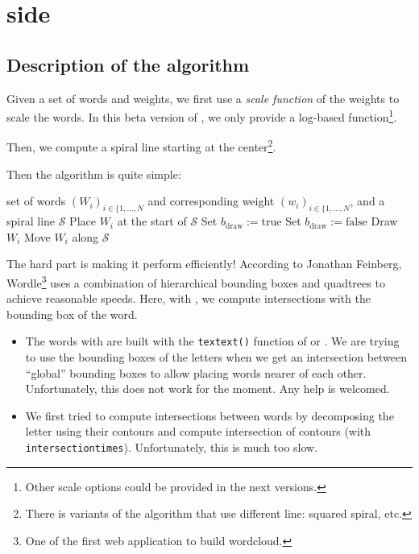\documentclass[english]{ltxdoc}
\begin{document}
\section{ side}

\subsection{Description of the algorithm}

Given a set of words and weights, we first use a
\emph{scale function} of the weights to scale the words. In this beta version of
, we only provide a log-based function\footnote{Other scale
options could be provided in the next versions.}. 

Then, we compute a spiral line starting at the center\footnote{There is variants
of the algorithm that use different line: squared spiral, etc.}.

Then the algorithm is quite simple:
\begin{algorithmic}[1]
\Require set of words $(W_i)_{i\in\{1,\dots,N}$ and corresponding weight
$(w_i)_{i\in\{1,\dots,N}$, and a spiral line $\mathcal{S}$
\State Place $W_i$ at the start of $\mathcal{S}$
\Repeat
  \State Set $b_\text{draw}:=\text{true}$
    \State Set $b_\text{draw}:=\text{false}$
    \EndIf
  \EndFor
    \State Draw $W_i$
  \Else
    \State Move $W_i$ along $\mathcal{S}$
  \EndIf
{}
\EndFor
\end{algorithmic}

The hard part is making it perform efficiently! According to Jonathan Feinberg,
Wordle\footnote{One of the first web application to build wordcloud.} uses a
combination of hierarchical bounding boxes and quadtrees to achieve reasonable
speeds. Here, with , we compute intersections with the bounding
box of the word. 

\begin{remark}
  \begin{itemize}
    \item 
  The words with  are built with the \lstinline+textext()+
  function of  or . We are trying to use the
  bounding boxes of the letters when we get an intersection between ``global''
  bounding boxes to allow placing words nearer of each other. Unfortunately,
  this does not work for the moment. Any help is welcomed. \medskip

  \item We first tried to compute intersections between words by decomposing the
  letter using their contours and compute intersection of contours (with
  \lstinline+intersectiontimes+). Unfortunately, this is much too slow. 
\end{itemize}
  
\end{remark}
\end{document}

